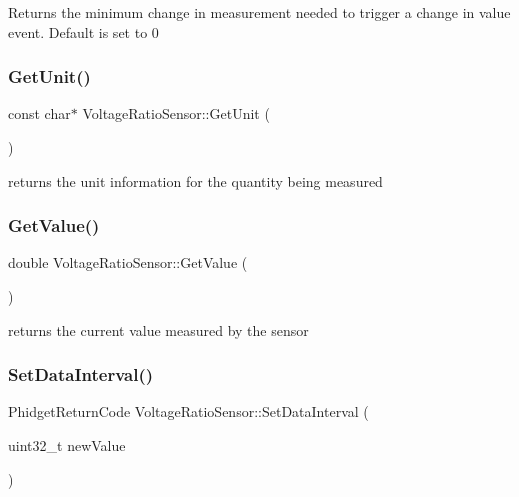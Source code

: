 Returns the minimum change in measurement needed to trigger a change in value event. Default is set to 0\mbox{\label{classVoltageRatioSensor_a65c712b7dfdadf4fea644c249ac779ce}} 
\subsubsection{\texorpdfstring{Get\+Unit()}{GetUnit()}}
{\footnotesize\ttfamily const char$\ast$ Voltage\+Ratio\+Sensor\+::\+Get\+Unit (\begin{DoxyParamCaption}{ }\end{DoxyParamCaption})\hspace{0.3cm}{\ttfamily [inline]}}

returns the unit information for the quantity being measured\mbox{\label{classVoltageRatioSensor_a6b4a3caac9216b8710e98bb504603a69}} 
\subsubsection{\texorpdfstring{Get\+Value()}{GetValue()}}
{\footnotesize\ttfamily double Voltage\+Ratio\+Sensor\+::\+Get\+Value (\begin{DoxyParamCaption}{ }\end{DoxyParamCaption})\hspace{0.3cm}{\ttfamily [inline]}}

returns the current value measured by the sensor\mbox{\label{classVoltageRatioSensor_ac89f4c06cb69bf4071fd965b51c3fa4e}} 
\subsubsection{\texorpdfstring{Set\+Data\+Interval()}{SetDataInterval()}}
{\footnotesize\ttfamily Phidget\+Return\+Code Voltage\+Ratio\+Sensor\+::\+Set\+Data\+Interval (\begin{DoxyParamCaption}\item[{uint32\+\_\+t}]{new\+Value }\end{DoxyParamCaption})\hspace{0.3cm}{\ttfamily [inline]}}


